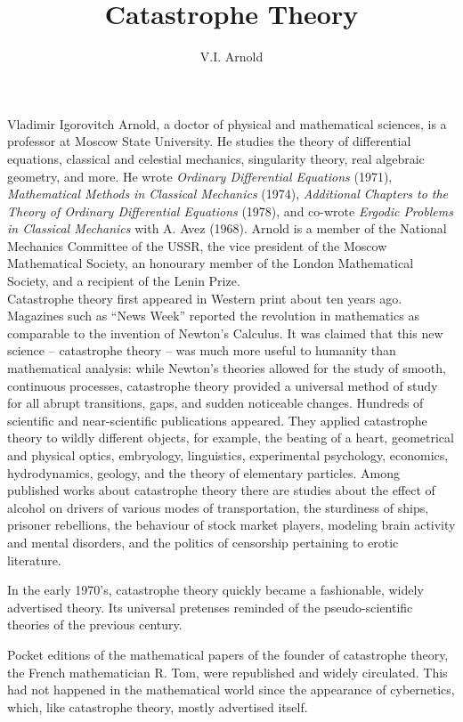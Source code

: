 \documentclass[12pt]{amsart}
\title{Catastrophe Theory}
\author{V.I. Arnold}
\begin{document}
\maketitle
{\fontsize{9pt}{1em}\selectfont
Vladimir Igorovitch Arnold, a doctor of physical and mathematical sciences, is a
professor at Moscow State University.
He studies the theory of differential equations, classical and celestial
mechanics, singularity theory, real algebraic geometry, and more.
He wrote \textit{Ordinary Differential Equations} (1971), \textit{Mathematical
Methods in Classical Mechanics} (1974), \textit{Additional Chapters to the
Theory of Ordinary Differential Equations} (1978), and co-wrote \textit{Ergodic
Problems in Classical Mechanics} with A. Avez (1968).
Arnold is a member of the National Mechanics Committee of the USSR, the vice
president of the Moscow Mathematical Society, an honourary member of the London
Mathematical Society, and a recipient of the Lenin Prize.}\\

Catastrophe theory first appeared in Western print about ten years ago.
Magazines such as ``News Week'' reported the revolution in mathematics as
comparable to the invention of Newton's Calculus.
It was claimed that this new science -- catastrophe theory -- was much more
useful to humanity than mathematical analysis: while Newton's theories allowed
for the study of smooth, continuous processes, catastrophe theory provided a
universal method of study for all abrupt transitions, gaps, and sudden
noticeable changes.
Hundreds of scientific and near-scientific publications appeared.
They applied catastrophe theory to wildly different objects, for example, the
beating of a heart, geometrical and physical optics, embryology, linguistics,
experimental psychology, economics, hydrodynamics, geology, and the theory of
elementary particles.
Among published works about catastrophe theory there are studies about the
effect of alcohol on drivers of various modes of transportation, the sturdiness
of ships, prisoner rebellions, the behaviour of stock market players, modeling
brain activity and mental disorders, and the politics of censorship pertaining
to erotic literature.

In the early 1970's, catastrophe theory quickly became a fashionable, widely
advertised theory.
Its universal pretenses reminded of the pseudo-scientific theories of the
previous century.

Pocket editions of the mathematical papers of the founder of catastrophe theory,
the French mathematician R. Tom, were republished and widely circulated.
This had not happened in the mathematical world since the appearance of
cybernetics, which, like catastrophe theory, mostly advertised itself.
\end{document}
